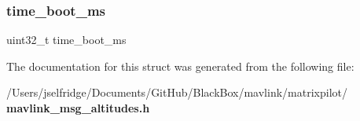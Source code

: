 \mbox{\label{struct____mavlink__altitudes__t_ad4e96ee46e36270d1ab66060e46f8c79}} 
\subsubsection{time\+\_\+boot\+\_\+ms}
{\footnotesize\ttfamily uint32\+\_\+t time\+\_\+boot\+\_\+ms}



The documentation for this struct was generated from the following file\+:\begin{DoxyCompactItemize}
\item 
/\+Users/jselfridge/\+Documents/\+Git\+Hub/\+Black\+Box/mavlink/matrixpilot/\textbf{ mavlink\+\_\+msg\+\_\+altitudes.\+h}\end{DoxyCompactItemize}
